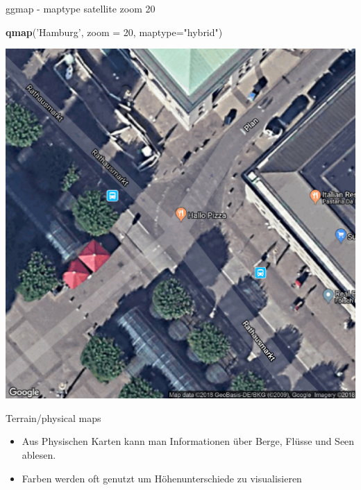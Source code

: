 \documentclass[ignorenonframetext,]{beamer}
\newenvironment{Shaded}{\begin{snugshade}}{\end{snugshade}}
\newcommand{\DataTypeTok}[1]{\textcolor[rgb]{0.13,0.29,0.53}{#1}}
\newcommand{\DecValTok}[1]{\textcolor[rgb]{0.00,0.00,0.81}{#1}}
\newcommand{\KeywordTok}[1]{\textcolor[rgb]{0.13,0.29,0.53}{\textbf{#1}}}
\newcommand{\NormalTok}[1]{#1}
\newcommand{\StringTok}[1]{\textcolor[rgb]{0.31,0.60,0.02}{#1}}
\begin{document}
\begin{frame}[fragile]{ggmap - maptype satellite zoom 20}
\protect\hypertarget{ggmap---maptype-satellite-zoom-20}{}

\begin{Shaded}
\begin{Highlighting}[]
\KeywordTok{qmap}\NormalTok{(}\StringTok{'Hamburg'}\NormalTok{, }\DataTypeTok{zoom =} \DecValTok{20}\NormalTok{, }\DataTypeTok{maptype=}\StringTok{"hybrid"}\NormalTok{)}
\end{Highlighting}
\end{Shaded}

\includegraphics{figure/ham_map.pdf}

\end{frame}

\begin{frame}{Terrain/physical maps}
\protect\hypertarget{terrainphysical-maps}{}

\begin{itemize}
\item
  Aus Physischen Karten kann man Informationen über Berge, Flüsse und
  Seen ablesen.
\item
  Farben werden oft genutzt um Höhenunterschiede zu visualisieren
\end{itemize}

\end{frame}
\end{document}
